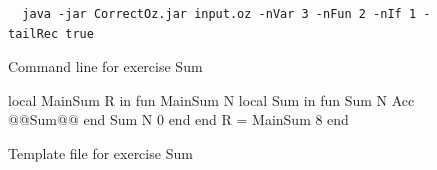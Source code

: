\documentclass[11pt,a4paper,twoside,openright]{report}
\begin{document}
\begin{figure}[!ht]
  \begin{lstlisting}
  java -jar CorrectOz.jar input.oz -nVar 3 -nFun 2 -nIf 1 -tailRec true
  \end{lstlisting}
 \caption{Command line for exercise Sum}
 \label{fig:sum}
\end{figure}

\begin{figure}[!ht]
  \begin{OZ}
  local MainSum R in
    fun {MainSum N}
      local Sum in
        fun {Sum N Acc}
          @@Sum@@
        end
        {Sum N 0}
      end
    end
    R = {MainSum 8}
  end
  \end{OZ}
 \caption{Template file for exercise Sum}
 \label{fig:sum_temp}
\end{figure}



%
%
\end{document}
